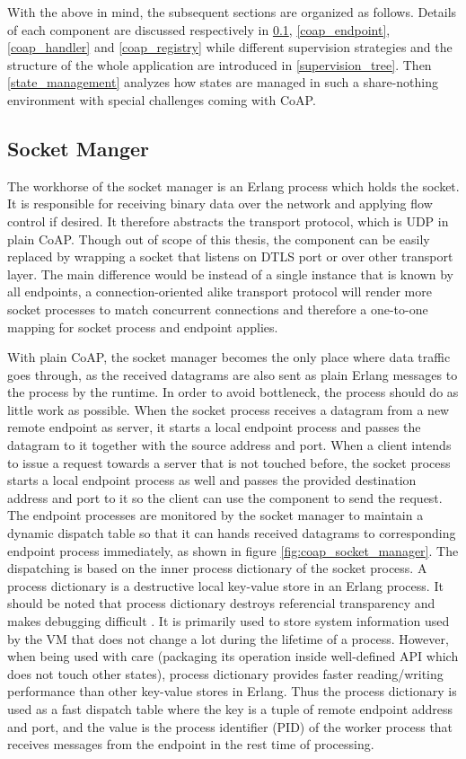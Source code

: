 With the above in mind, the subsequent sections are organized as follows. Details of each component are discussed respectively in \ref{socket_manager}, \ref{coap_endpoint}, \ref{coap_handler} and \ref{coap_registry} while different supervision strategies and the structure of the whole application are introduced in \ref{supervision_tree}. Then \ref{state_management} analyzes how states are managed in such a share-nothing environment with special challenges coming with CoAP. 

\subsection{Socket Manger}\label{socket_manager}

The workhorse of the socket manager is an Erlang process which holds the socket. It is responsible for receiving binary data over the network and applying flow control if desired. 
It therefore abstracts the transport protocol, which is UDP in plain CoAP. Though out of scope of this thesis, the component can be easily replaced by wrapping a socket that listens on DTLS port or over other transport layer. The main difference would be instead of a single instance that is known by all endpoints, a connection-oriented alike transport protocol will render more socket processes to match concurrent connections and therefore a one-to-one mapping for socket process and endpoint applies. 

With plain CoAP, the socket manager becomes the only place where data traffic goes through, as the received datagrams are also sent as plain Erlang messages to the process by the runtime. In order to avoid bottleneck, the process should do as little work as possible. When the socket process receives a datagram from a new remote endpoint as server, it starts a local endpoint process and passes the datagram to it together with the source address and port. When a client intends to issue a request towards a server that is not touched before, the socket process starts a local endpoint process as well and passes the provided destination address and port to it so the client can use the component to send the request. The endpoint processes are monitored by the socket manager to maintain a dynamic dispatch table so that it can hands received datagrams to corresponding endpoint process immediately, as shown in figure \ref{fig:coap_socket_manager}. The dispatching is based on the inner process dictionary of the socket process. A process dictionary is a destructive local key-value store in an Erlang process. It should be noted that process dictionary destroys referencial transparency and makes debugging difficult \cite{}. It is primarily used to store system information used by the VM that does not change a lot during the lifetime of a process. However, when being used with care (packaging its operation inside well-defined API which does not touch other states), process dictionary provides faster reading/writing performance than other key-value stores in Erlang. Thus the process dictionary is used as a fast dispatch table where the key is a tuple of remote endpoint address and port, and the value is the process identifier (PID) of the worker process that receives messages from the endpoint in the rest time of processing. 

